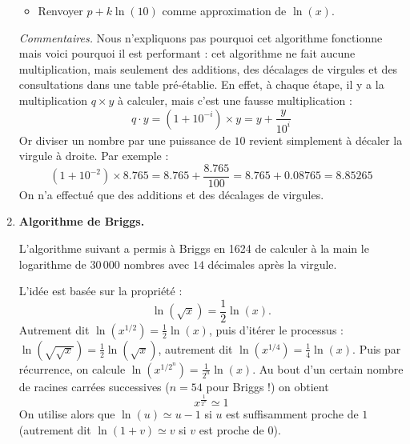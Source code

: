 \documentclass[11pt,class=report,crop=false]{standalone}
\begin{document}
\begin{activite}
\begin{enumerate}
\begin{algorithme}
\begin{itemize}
  \item Renvoyer $p+k\ln(10)$ comme approximation de $\ln(x)$.
    
 \end{itemize}  
 \end{algorithme}   
 
 
    \emph{Commentaires.} Nous n'expliquons pas pourquoi cet algorithme fonctionne mais voici pourquoi il est performant : cet algorithme ne fait aucune multiplication, mais seulement des additions, des décalages de virgules et des consultations dans une table pré-établie.
  En effet, à chaque étape, il y a la multiplication $q \times y$ à calculer, mais c'est une \og{}fausse\fg{} multiplication : 
  $$q \cdot y = \left(1+10^{-i}\right) \times y = y + \frac{y}{10^i}$$
  Or diviser un nombre par une puissance de $10$ revient simplement à décaler la virgule à droite.
  Par exemple :
  $$\left(1+10^{-2}\right) \times 8.765 = 8.765 + \frac{8.765}{100} = 8.765 + 0.08765 = 8.85265$$
  On n'a effectué que des additions et des décalages de virgules.
  
    
  \item \textbf{Algorithme de Briggs.}
    
    L'algorithme suivant a permis à Briggs en 1624 de calculer à la main le logarithme de $30\,000$ nombres avec $14$ décimales après la virgule.
    
    L'idée est basée sur la propriété : 
    $$\ln(\sqrt{x}) = \frac12 \ln(x).$$
    Autrement dit $\ln\left(x^{1/2}\right) = \frac12 \ln(x)$, puis d'itérer le processus :
    $\ln\left(\sqrt{\sqrt{x}}\right) =  \frac12 \ln(\sqrt{x})$, autrement dit $\ln\left(x^{1/4}\right) = \frac14 \ln(x)$. Puis par récurrence, on calcule $\ln\left(x^{1/{2^n}}\right) = \frac1{2^n} \ln(x)$.
     Au bout d'un certain nombre de racines carrées successives ($n=54$ pour Briggs !) on obtient 
     $$x^{\frac{1}{2^n}} \simeq 1$$
     On utilise alors que $\ln(u) \simeq u-1$ si $u$ est suffisamment proche de $1$ (autrement dit $\ln(1+v) \simeq v$ si $v$ est proche de $0$).
     

\end{enumerate}
\end{activite}
\end{document}

